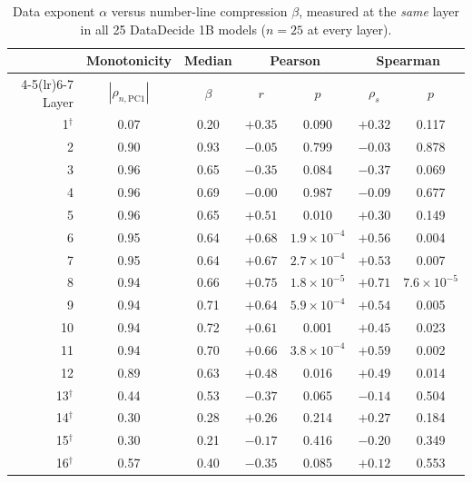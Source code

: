 \documentclass[11pt]{article}
\begin{document}
\begin{table}[ht]
\centering
\begin{threeparttable}
\caption{Data exponent $\alpha$ versus number-line compression $\beta$, measured at the \emph{same}
layer in all 25 DataDecide 1B models ($n=25$ at every layer).}
\label{tab:alpha-beta-by-layer}
\begin{tabular}{rcc cc cc}
\toprule
 & Monotonicity & Median & \multicolumn{2}{c}{Pearson} & \multicolumn{2}{c}{Spearman} \\
\cmidrule(lr){4-5}\cmidrule(lr){6-7}
Layer & $|\rho_{n,\mathrm{PC1}}|$ & $\beta$ & $r$ & $p$ & $\rho_s$ & $p$ \\
\midrule
    1$^\dagger$ & 0.07 & 0.20 & $+0.35$ & 0.090 & $+0.32$ & 0.117 \\
    2 & 0.90 & 0.93 & $-0.05$ & 0.799 & $-0.03$ & 0.878 \\
    3 & 0.96 & 0.65 & $-0.35$ & 0.084 & $-0.37$ & 0.069 \\
    4 & 0.96 & 0.69 & $-0.00$ & 0.987 & $-0.09$ & 0.677 \\
    5 & 0.96 & 0.65 & $+0.51$ & 0.010 & $+0.30$ & 0.149 \\
    6 & 0.95 & 0.64 & $\mathbf{+0.68}$ & $1.9\times10^{-4}$ & $+0.56$ & 0.004 \\
    7 & 0.95 & 0.64 & $\mathbf{+0.67}$ & $2.7\times10^{-4}$ & $+0.53$ & 0.007 \\
    8 & 0.94 & 0.66 & $\mathbf{+0.75}$ & $1.8\times10^{-5}$ & $\mathbf{+0.71}$ & $7.6\times10^{-5}$ \\
    9 & 0.94 & 0.71 & $\mathbf{+0.64}$ & $5.9\times10^{-4}$ & $+0.54$ & 0.005 \\
    10 & 0.94 & 0.72 & $\mathbf{+0.61}$ & 0.001 & $+0.45$ & 0.023 \\
    11 & 0.94 & 0.70 & $\mathbf{+0.66}$ & $3.8\times10^{-4}$ & $\mathbf{+0.59}$ & 0.002 \\
    12 & 0.89 & 0.63 & $+0.48$ & 0.016 & $+0.49$ & 0.014 \\
    13$^\dagger$ & 0.44 & 0.53 & $-0.37$ & 0.065 & $-0.14$ & 0.504 \\
    14$^\dagger$ & 0.30 & 0.28 & $+0.26$ & 0.214 & $+0.27$ & 0.184 \\
    15$^\dagger$ & 0.30 & 0.21 & $-0.17$ & 0.416 & $-0.20$ & 0.349 \\
    16$^\dagger$ & 0.57 & 0.40 & $-0.35$ & 0.085 & $+0.12$ & 0.553 \\
\bottomrule
\end{tabular}
\begin{tablenotes}\footnotesize

\end{tablenotes}
\end{threeparttable}
\end{table}
\end{document}
